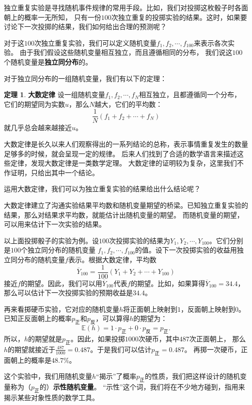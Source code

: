 \documentclass[12pt,UTF8]{ctexbook}
\theoremstyle{definition}
\newtheorem{tm}{定理}[section]
\theoremstyle{plain}
\begin{document}
独立重复实验是寻找随机事件规律的常用手段。比如，我们对投掷这枚骰子时各面朝上的概率一无所知，
只有一份$100$次独立重复的投掷实验的结果。这时，如果要讨论下一次投掷的结果，我们如何给出合理的预测呢？

对于这$100$次独立重复实验，我们可以定义随机变量$f_1,f_2,\cdots , f_{100}$来表示各次实验。
由于我们假设这些随机变量相互独立，而且遵循相同的分布，
我们说这$100$个随机变量是\textbf{独立同分布}的。

对于独立同分布的一组随机变量，我们有以下的定理：
\begin{tm}\textbf{大数定律}
    设一组随机变量$f_1, f_2, \cdots, f_{N}$相互独立，且都遵循同一个分布，
    它们的期望同为实数$u$，那么$N$越大，它们的平均数：
    $$\frac{1}{N}\left(f_1 + f_2 + \cdots + f_{N}\right)$$
    就几乎总会越来越接近$u$。
\end{tm}

大数定律是长久以来人们观察得出的一系列结论的总称，表示事情重复发生的数量足够多的时候，就会呈现一定的规律。
后来人们找到了合适的数学语言来描述这些定律，发现大数定律是一类数学定理。
大数定律的证明较为复杂，这里我们不作证明，只给出其中一个结论。

运用大数定律，我们可以为独立重复实验的结果给出什么结论呢？

大数定律建立了沟通实验结果平均数和随机变量期望的桥梁。已知独立重复实验的结果，那么对结果求平均数，就能估计出随机变量的期望。
而随机变量的期望，可以用来估计下一次实验的结果。

以上面投掷骰子的实验为例。设$100$次投掷实验的结果为$Y_1, Y_2, \cdots , Y_{100}$。它们分别是$100$个独立同分布的随机变量
$f_1, f_2, \cdots, f_{100}$的值。设下一次投掷实验的收益用独立同分布的随机变量$f$表示。根据大数定律，平均数
$$\overline{Y}_{100} = \frac{1}{100}(Y_1 + Y_2 + \cdots + Y_{100})$$
接近$f$的期望。因此，我们可以用$\overline{Y}_{100}$代表$f$的期望。比如，如果算得$\overline{Y}_{100} = 34.4$，
那么可以估计下一次投掷实验的预期收益是$34.4$。

再来看掷硬币实验，它对应的随机变量$h$将正面朝上映射到$1$，反面朝上映射到$0$。
已知正反面朝上的概率$p_{\text{正}}$和$p_{\text{反}}$，可以算得$h$的期望为：
$$ \mathbb{E}(h) = 1 \cdot p_{\text{正}} + 0 \cdot p_{\text{反}} = p_{\text{正}}.$$
所以，$h$的期望就是$p_{\text{正}}$。因此，如果投掷$1000$次硬币，其中$487$次正面朝上，
那么$h$的期望就接近于$\frac{487}{1000} = 0.487$。于是我们可以估计$p_{\text{正}} = 0.487$。
再掷一次硬币，正面朝上的概率是$48.7\%$。

这个实验中，我们用随机变量$h$“揭示”了概率$p_{\text{正}}$的性质，我们把这样设计的随机变量称为（$p_{\text{正}}$的）\textbf{示性随机变量}。
“示性”这个词，我们将在不少地方碰到，指用来揭示某些对象性质的数学工具。
\end{document}
